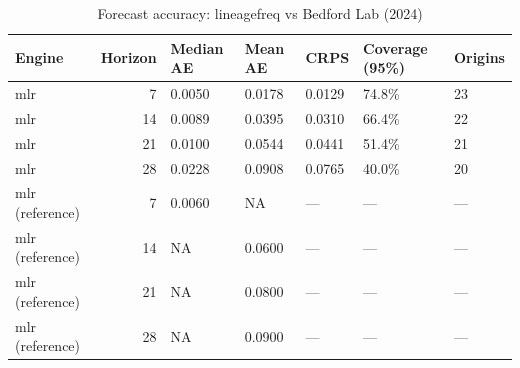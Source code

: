 \begin{table}[!h]
\centering
\caption{\label{tab:tab:benchmark}Forecast accuracy: lineagefreq vs Bedford Lab (2024)}
\centering
\begin{tabular}[t]{lrlllll}
\toprule
Engine & Horizon & Median AE & Mean AE & CRPS & Coverage (95\%) & Origins\\
\midrule
mlr & 7 & 0.0050 & 0.0178 & 0.0129 & 74.8\% & 23\\
mlr & 14 & 0.0089 & 0.0395 & 0.0310 & 66.4\% & 22\\
mlr & 21 & 0.0100 & 0.0544 & 0.0441 & 51.4\% & 21\\
mlr & 28 & 0.0228 & 0.0908 & 0.0765 & 40.0\% & 20\\
mlr (reference) & 7 & 0.0060 & NA & --- & --- & ---\\
\addlinespace
mlr (reference) & 14 & NA & 0.0600 & --- & --- & ---\\
mlr (reference) & 21 & NA & 0.0800 & --- & --- & ---\\
mlr (reference) & 28 & NA & 0.0900 & --- & --- & ---\\
\bottomrule
\end{tabular}
\end{table}
